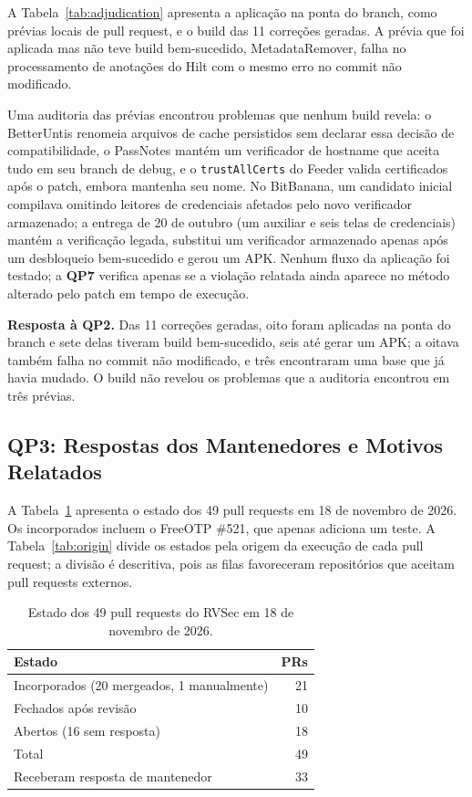 \documentclass[conference]{IEEEtran}
\newcommand{\researchq}[1]{\textbf{QP#1}}
\begin{document}
A Tabela~\ref{tab:adjudication} apresenta a aplicação na ponta do branch, como
prévias locais de pull request, e o build das 11 correções geradas. A prévia
que foi aplicada mas não teve build bem-sucedido, MetadataRemover, falha no
processamento de anotações do Hilt com o mesmo erro no commit não modificado.

Uma auditoria das prévias encontrou problemas que nenhum build revela: o BetterUntis renomeia
arquivos de cache persistidos sem declarar essa decisão de compatibilidade, o PassNotes
mantém um verificador de hostname que aceita tudo em seu branch de debug, e o
\texttt{trustAllCerts} do Feeder valida certificados após o patch, embora mantenha
seu nome. No BitBanana, um candidato inicial compilava omitindo leitores de credenciais
afetados pelo novo verificador armazenado; a entrega de 20 de outubro (um
auxiliar e seis telas de credenciais) mantém a verificação legada, substitui um
verificador armazenado apenas após um desbloqueio bem-sucedido e gerou um APK. Nenhum
fluxo da aplicação foi testado; a \researchq{7} verifica apenas se a violação
relatada ainda aparece no método alterado pelo patch em tempo de execução.

\textbf{Resposta à \researchq{2}.} Das 11 correções geradas, oito foram aplicadas
na ponta do branch e sete delas tiveram build bem-sucedido, seis até gerar um APK;
a oitava também falha no commit não modificado, e três encontraram uma base que
já havia mudado. O build
não revelou os problemas que a auditoria encontrou em três prévias.

\subsection{\researchq{3}: Respostas dos Mantenedores e Motivos Relatados}
\label{subsec:rq3}

A Tabela~\ref{tab:pr-state} apresenta o estado dos 49 pull requests em 18 de
novembro de 2026. Os incorporados incluem o FreeOTP \#521, que apenas adiciona um teste. A
Tabela~\ref{tab:origin} divide os estados pela origem da execução de cada pull
request; a divisão é descritiva, pois as filas favoreceram repositórios que
aceitam pull requests externos.

\begin{table}[H]
\centering
\caption{Estado dos 49 pull requests do RVSec em 18 de novembro de 2026.}
\label{tab:pr-state}
\begin{tabular}{lr}
\toprule
Estado & PRs \\
\midrule
Incorporados (20 mergeados, 1 manualmente) & 21 \\
Fechados após revisão                  & 10 \\
Abertos (16 sem resposta)            & 18 \\
\midrule
Total                                & 49 \\
Receberam resposta de mantenedor       & 33 \\
\bottomrule
\end{tabular}
\end{table}
\end{document}
